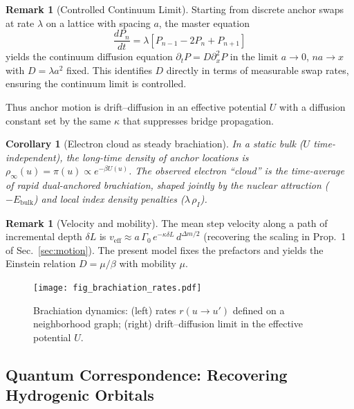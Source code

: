 \documentclass[11pt]{article}
\theoremstyle{plain}
\newtheorem{corollary}[theorem]{Corollary}
\theoremstyle{definition}
\newtheorem{remark}[theorem]{Remark}
\begin{document}
\begin{remark}[Controlled Continuum Limit]
  Starting from discrete anchor swaps at rate $\lambda$ on a lattice with spacing $a$, the master equation
  \begin{equation}
    \frac{dP_n}{dt} = \lambda [P_{n-1} - 2P_n + P_{n+1}]
  \end{equation}
  yields the continuum diffusion equation $\partial_t P = D \partial_x^2 P$ in the limit $a\to 0$, $na \to x$ with $D = \lambda a^2$ fixed. This identifies $D$ directly in terms of measurable swap rates, ensuring the continuum limit is controlled.
\end{remark}

Thus anchor motion is drift–diffusion in an effective potential $U$ with a diffusion constant set by the same $\kappa$ that suppresses bridge propagation.

\begin{corollary}[Electron cloud as steady brachiation]
  In a static bulk ($U$ time-independent), the long-time density of anchor locations is $\rho_\infty(u)=\pi(u)\propto e^{-\beta U(u)}$. The observed electron “cloud” is the time-average of rapid dual-anchored brachiation, shaped jointly by the nuclear attraction ($-E_{\mathrm{bulk}}$) and local index density penalties ($\lambda\,\rho_I$).
\end{corollary}

\begin{remark}[Velocity and mobility]
  The mean step velocity along a path of incremental depth $\delta L$ is $v_{\mathrm{eff}} \approx a\,\Gamma_0\,e^{-\kappa \delta L}\,d^{\Delta m/2}$ (recovering the scaling in Prop.~1 of Sec.~\ref{sec:motion}). The present model fixes the prefactors and yields the Einstein relation $D=\mu/\beta$ with mobility $\mu$.
\end{remark}

\begin{figure}[h]
  \centering
  \texttt{[image: fig\_brachiation\_rates.pdf]}
  \caption{Brachiation dynamics: (left) rates $r(u\!\to\!u')$ defined on a neighborhood graph; (right) drift–diffusion limit in the effective potential $U$.}
  \label{fig:brachiation-dynamics}
\end{figure}

\subsection{Quantum Correspondence: Recovering Hydrogenic Orbitals}
\label{subsec:quantum-correspondence}
\end{document}
